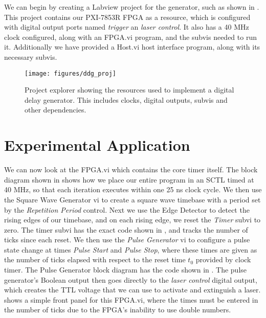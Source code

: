 We can begin by creating a Labview project for the generator, such as shown in .  This project contains our PXI-7853R FPGA as a resource, which is configured with digital output ports named \emph{trigger} an \emph{laser control}.  It also has a 40 MHz clock configured, along with an FPGA.vi program, and the subvis needed to run it. Additionally we have provided a Host.vi host interface program, along with its necessary subvis.


\begin{figure}[!ht] 
 \centering 
 \texttt{[image: figures/ddg\_proj]} 
 \caption[Digital delay generator project]{Project explorer showing the resources used to implement a digital delay generator.  This includes clocks, digital outputs, subvis and other dependencies.} 
 \label{fig:ddg_proj} 
\end{figure}
\section{Experimental Application}



We can now look at the FPGA.vi which contains the core timer itself.   The block diagram shown in  shows how we place our entire program in an SCTL timed at 40 MHz, so that each iteration executes within one 25 ns clock cycle.  We then use the Square Wave Generator vi to create a square wave timebase with a period set by the \emph{Repetition Period} control.  Next we use the Edge Detector to detect the rising edges of our timebase, and on each rising edge, we reset the \emph{Timer} subvi to zero.  The timer subvi has the exact code shown in , and tracks the number of ticks since each reset.  We then use the \emph{Pulse Generator} vi to configure a pulse state change at times \emph{Pulse Start} and \emph{Pulse Stop}, where these times are given as the number of ticks elapsed with respect to the reset time $t_0$ provided by clock timer.  The Pulse Generator block diagram has the code shown in .  The pulse generator's Boolean output then goes directly to the \emph{laser control} digital output, which creates the TTL voltage that we can use to activate and extinguish a laser.   shows a simple front panel for this FPGA.vi, where the times must be entered in the number of ticks due to the FPGA's inability to use double numbers.

